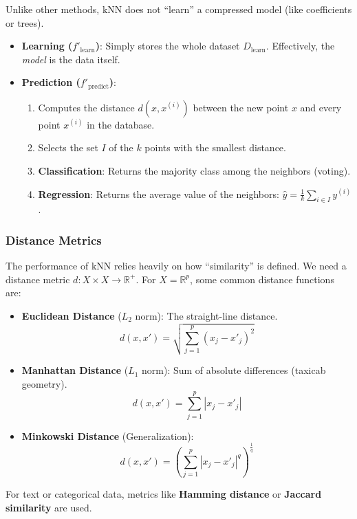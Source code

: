Unlike other methods, kNN does not ``learn'' a compressed model (like coefficients or trees).
\begin{itemize}
    \item \textbf{Learning ($f'_{\text{learn}}$)}: Simply stores the whole dataset $D_{\text{learn}}$. Effectively, the \textit{model} is the data itself.
    \item \textbf{Prediction ($f'_{\text{predict}}$)}:
    \begin{enumerate}
        \item Computes the distance $d(x, x^{(i)})$ between the new point $x$ and every point $x^{(i)}$ in the database.
        \item Selects the set $I$ of the $k$ points with the smallest distance.
        \item \textbf{Classification}: Returns the majority class among the neighbors (voting).
        \item \textbf{Regression}: Returns the average value of the neighbors: $\hat{y} = \frac{1}{k}\sum_{i \in I}y^{(i)}$.
    \end{enumerate}
\end{itemize}

\subsubsection{Distance Metrics}

The performance of kNN relies heavily on how ``similarity'' is defined. We need a distance metric $d: X \times X \to \mathbb{R}^+$.
For $X = \mathbb{R}^p$, some common distance functions are:
    
\begin{itemize}
    \item \textbf{Euclidean Distance} ($L_2$ norm): The straight-line distance.
    \small{
        $$ d(x, x') = \sqrt{\sum_{j=1}^{p}(x_j - x'_j)^2} $$
    }
    \item \textbf{Manhattan Distance} ($L_1$ norm): Sum of absolute differences (taxicab geometry).
    \small{
        $$ d(x, x') = \sum_{j=1}^{p}|x_j - x'_j| $$
    }
    \item \textbf{Minkowski Distance} (Generalization):
    \small{
        $$ d(x, x') = \left(\sum_{j=1}^{p}|x_j - x'_j|^q\right)^{\frac{1}{q}} $$
    }
\end{itemize}

For text or categorical data, metrics like \textbf{Hamming distance} or \textbf{Jaccard similarity} are used.

